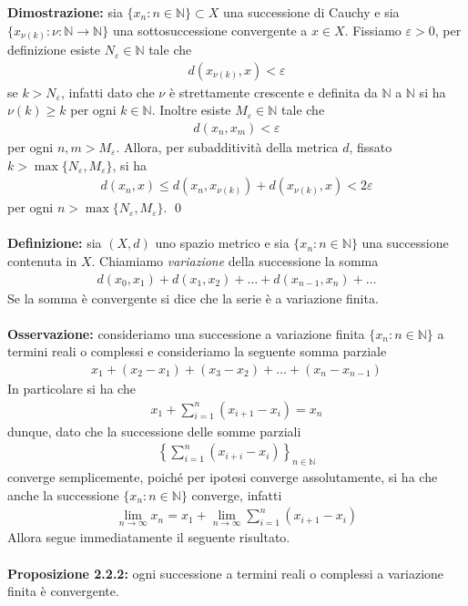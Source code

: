 \documentclass{article}
\numberwithin{equation}{subsection}
\begin{document}
\textbf{Dimostrazione:} sia $\{x_n : n \in \mathbb{N}\} \subset X$ una successione di Cauchy e sia $\{x_{\nu(k)} : \nu : \mathbb{N} \longrightarrow \mathbb{N}\}$ una sottosuccessione convergente a $x \in X$. Fissiamo $\varepsilon > 0$, per definizione esiste $N_\varepsilon \in \mathbb{N}$ tale che
\begin{align*}
    d(x_{\nu(k)}, x) < \varepsilon 
\end{align*}
se $k > N_\varepsilon$, infatti dato che $\nu$ è strettamente crescente e definita da $\mathbb{N}$ a $\mathbb{N}$ si ha $\nu(k) \geq k$ per ogni $k \in \mathbb{N}$. Inoltre esiste $M_\varepsilon \in \mathbb{N}$ tale che 
\begin{align*}
    d(x_n, x_m) < \varepsilon 
\end{align*}
per ogni $n, m > M_\varepsilon$. Allora, per subadditività della metrica $d$, fissato $k > \max\{N_\varepsilon, M_\varepsilon\}$, si ha
\begin{align*}
    d(x_n, x) \leq d(x_n, x_{\nu(k)}) + d(x_{\nu(k)}, x) < 2\varepsilon 
\end{align*}
per ogni $n > \max\{N_\varepsilon, M_\varepsilon\}$. \qed \\ \\
\textbf{Definizione:} sia $(X, d)$ uno spazio metrico e sia $\{x_n : n \in \mathbb{N}\}$ una successione contenuta in $X$. Chiamiamo \textit{variazione} della successione la somma
\begin{align*}
    d(x_0, x_1) + d(x_1, x_2) + \dots + d(x_{n - 1}, x_n) + \dots 
\end{align*}
Se la somma è convergente si dice che la serie è a variazione finita. \\ \\
\textbf{Osservazione:} consideriamo una successione a variazione finita $\{x_n : n \in \mathbb{N}\}$ a termini reali o complessi e consideriamo la seguente somma parziale
\begin{align*}
    x_1 + (x_2 - x_1) + (x_3 - x_2) + \dots + (x_n - x_{n - 1}) 
\end{align*}
In particolare si ha che
\begin{align*}
    x_1 + \sum_{i = 1}^n(x_{i + 1} - x_i) = x_n 
\end{align*}
dunque, dato che la successione delle somme parziali
\begin{align*}
    \left\{\sum_{i = 1}^n(x_{i + i} - x_i)\right\}_{n \in \mathbb{N}} 
\end{align*}
converge semplicemente, poiché per ipotesi converge assolutamente, si ha che anche la successione $\{x_n : n \in \mathbb{N}\}$ converge, infatti
\begin{align*}
    \lim_{n \rightarrow \infty}x_n = x_1 + \lim_{n \rightarrow \infty}\sum_{i = 1}^n(x_{i + 1} - x_i) 
\end{align*}
Allora segue immediatamente il seguente risultato. \\ \\
\textbf{Proposizione 2.2.2:} ogni successione a termini reali o complessi a variazione finita è convergente. \\ 
\end{document}

